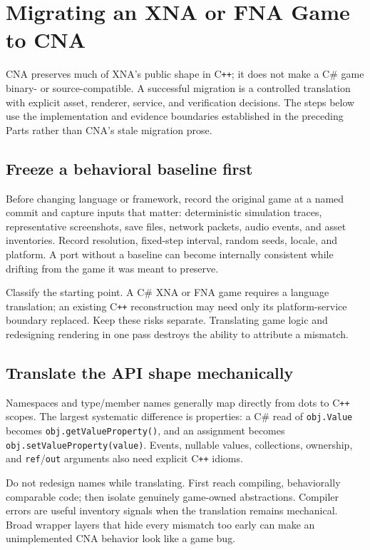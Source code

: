 \chapter{Migrating an XNA or FNA Game to CNA}
\label{ch:migration-guide}

CNA preserves much of XNA's public shape in C\texttt{++}; it does not make a C\# game binary- or
source-compatible.  A successful migration is a controlled translation with explicit asset,
renderer, service, and verification decisions.  The steps below use the implementation and
evidence boundaries established in the preceding Parts rather than CNA's stale migration prose.



\section{Freeze a behavioral baseline first}

Before changing language or framework, record the original game at a named commit and capture
inputs that matter: deterministic simulation traces, representative screenshots, save files,
network packets, audio events, and asset inventories.  Record resolution, fixed-step interval,
random seeds, locale, and platform.  A port without a baseline can become internally consistent
while drifting from the game it was meant to preserve.

Classify the starting point.  A C\# XNA or FNA game requires a language translation; an existing
C\texttt{++} reconstruction may need only its platform-service boundary replaced.  Keep these
risks separate.  Translating game logic and redesigning rendering in one pass destroys the
ability to attribute a mismatch.

\section{Translate the API shape mechanically}

Namespaces and type/member names generally map directly from dots to C\texttt{++} scopes.  The
largest systematic difference is properties: a C\# read of \texttt{obj.Value} becomes
\texttt{obj.getValueProperty()}, and an assignment becomes
\texttt{obj.setValueProperty(value)}.  Events, nullable values, collections, ownership, and
\texttt{ref}/\texttt{out} arguments also need explicit C\texttt{++} idioms.

Do not redesign names while translating.  First reach compiling, behaviorally comparable code;
then isolate genuinely game-owned abstractions.  Compiler errors are useful inventory signals when
the translation remains mechanical.  Broad wrapper layers that hide every mismatch too early can
make an unimplemented CNA behavior look like a game bug.

